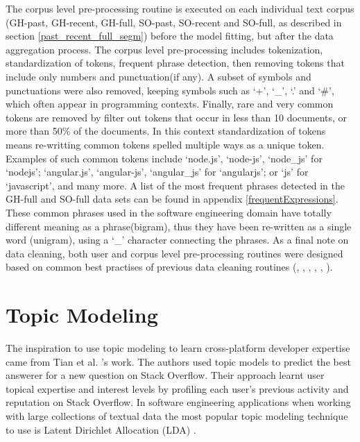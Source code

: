         The corpus level pre-processing routine is executed on each individual text corpus (GH-past, GH-recent, GH-full, SO-past, SO-recent and SO-full, as described in section \ref{past_recent_full_segm}) before the model fitting, but after the data aggregation process. The corpus level pre-processing includes tokenization, standardization of tokens, frequent phrase detection, then removing tokens that include only numbers and punctuation(if any). A subset of symbols and punctuations were also removed, keeping symbols such as ‘+’, ‘\_’, ‘.’ and ‘\#’, which often appear in programming contexts. Finally, rare and very common tokens are removed by filter out tokens that occur in less than 10 documents, or more than 50\% of the documents. In this context standardization of tokens means re-writting common tokens spelled multiple ways as a unique token. Examples of such common tokens include ‘node.js’, ‘node-js’, ‘node\_js’ for ‘nodejs’; ‘angular.js’, ‘angular-js’, ‘angular\_js’ for ‘angularjs’; or ‘js’ for ‘javascript’, and many more. A list of the most frequent phrases detected in the GH-full and SO-full data sets can be found in appendix \ref{frequentExpressions}. These common phrases used in the software engineering domain have totally different meaning as a phrase(bigram), thus they have been re-written as a single word (unigram), using a ‘\_’ character connecting the phrases. As a final note on data cleaning, both user and corpus level pre-processing routines were designed based on common best practises of previous data cleaning routines (\cite{tian2013predicting}, \cite{campbell2015latent}, \cite{treude2019predicting}, \cite{efstathiou2018word}, \cite{boyd2014care}, \cite{liao2019status}).

\section{Topic Modeling\label{topic_modeling}}

    The inspiration to use topic modeling to learn cross-platform developer expertise came from Tian et al. \cite{tian2013predicting}'s work. The authors used topic models to predict the best answerer for a new question on Stack Overflow. Their approach learnt user topical expertise and interest levels by profiling each user's previous activity and reputation on Stack Overflow. In software engineering applications when working with large collections of textual data the most popular topic modeling technique to use is Latent Dirichlet Allocation (LDA) \cite{campbell2015latent}. 
    
